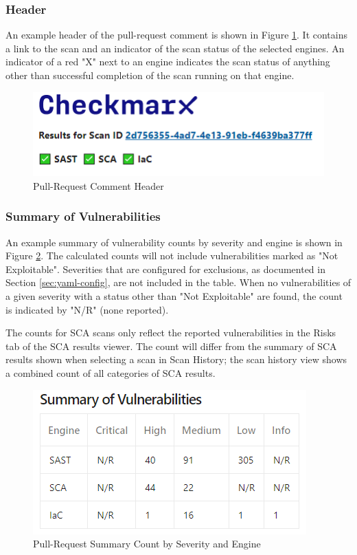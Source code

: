 \subsubsection{Header}

An example header of the pull-request comment is shown in Figure
\ref{fig:pr-header-section}.  It contains a link to the scan
and an indicator of the scan status of the selected engines.  An indicator
of a red "X" next to an engine indicates the scan status of anything other
than successful completion of the scan running on that engine.

\begin{figure}[ht]
    \includegraphics[width=\textwidth]{graphics/pr-header.png}
    \caption{Pull-Request Comment Header}
    \label{fig:pr-header-section}
\end{figure}

\subsubsection{Summary of Vulnerabilities}

An example summary of vulnerability counts by severity and engine 
is shown in Figure \ref{fig:pr-summary}.  The calculated counts will not
include vulnerabilities marked as "Not Exploitable".  Severities that
are configured for exclusions, as documented in Section
\ref{sec:yaml-config}, are not included in the table.  When no 
vulnerabilities of a given severity with a status other than 
"Not Exploitable" are found, the count is indicated by "N/R" (none reported).


The counts for SCA scans only reflect the reported vulnerabilities in the
Risks tab of the SCA results viewer.  The count will differ from the summary
of SCA results shown when selecting a scan in Scan History; the scan
history view shows a combined count of all categories of SCA results.

\begin{figure}[ht]
    \includegraphics[width=\textwidth]{graphics/pr-summary.png}
    \caption{Pull-Request Summary Count by Severity and Engine}
    \label{fig:pr-summary}
\end{figure}


